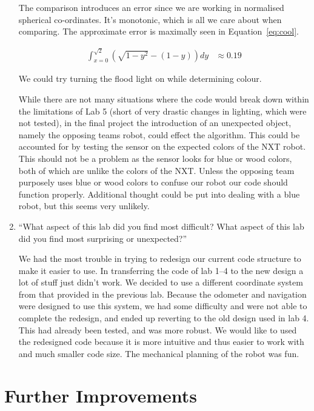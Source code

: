 \documentclass[twocolumn]{article}
\begin{document}
\begin{enumerate}
The comparison introduces an error since we are working in normalised spherical co-ordinates. It's monotonic, which is all we care about when comparing. The approximate error is maximally seen in Equation~\ref{eq:cool}.

\begin{align}
\int_{x=0}^{\sqrt{2}} \left(
	\sqrt{1-y^{2}} - (1 - y)
\right) dy &\approx 0.19
\label{eq:cool}
\end{align}

We could try turning the flood light on while determining colour.

While there are not many situations where the code would break down within the limitations of Lab 5 (short of very drastic changes in lighting, which were not tested), in the final project the introduction of an unexpected object, namely the opposing teams robot, could effect the algorithm. This could be accounted for by testing the sensor on the expected colors of the NXT robot. This should not be a problem as the sensor looks for blue or wood colors, both of which are unlike the colors of the NXT. Unless the opposing team purposely uses blue or wood colors to confuse our robot our code should function properly. Additional thought could be put into dealing with a blue robot, but this seems very unlikely.

\item ``What aspect of this lab did you find most difficult? What aspect of this lab did you find most surprising or unexpected?''

We had the most trouble in trying to redesign our current code structure to make it easier to use. In transferring the code of lab 1--4\cite{alexneil1,alexneil2,alexneil3,alexneil4} to the new design a lot of stuff just didn't work. We decided to use a different coordinate system from that provided in the previous lab\cite{iso}. Because the odometer and navigation were designed to use this system, we had some difficulty and were not able to complete the redesign, and ended up reverting to the old design used in lab 4. This had already been tested, and was more robust. We would like to used the redesigned code because it is more intuitive and thus easier to work with and much smaller code size. The mechanical planning of the robot was fun.

\end{enumerate}

\section{Further Improvements}
\end{document}
